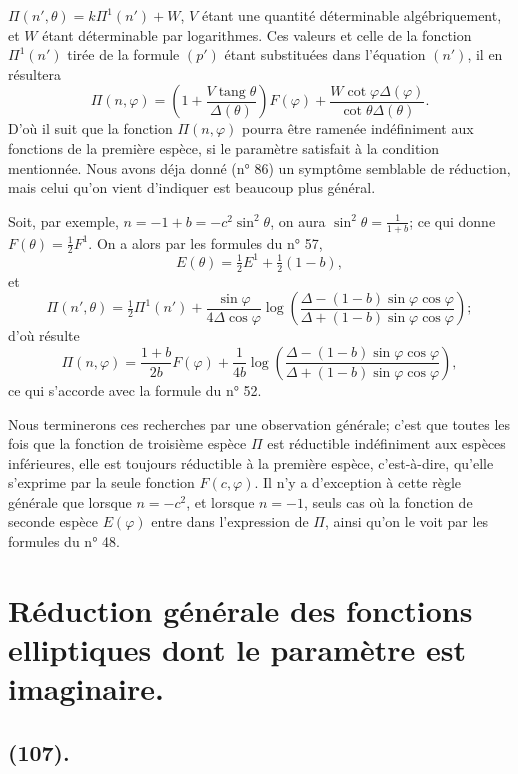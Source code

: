 \documentclass{article}
\begin{document}
$\Pi(n',\theta)=k\Pi^{1}(n')+W$, $V$ étant une quantité déterminable algébriquement, et $W$ étant déterminable par logarithmes. Ces valeurs et celle de la fonction $\Pi^{1}(n')$ tirée de la formule $(p')$ étant substituées dans l'équation $(n')$, il en résultera
\[ \Pi(n,\varphi)=\left(1+\frac{V\operatorname{tang}\theta}{\Delta(\theta)}\right)F(\varphi)+\frac{W\cot\varphi\Delta(\varphi)}{\cot\theta\Delta(\theta)}. \]
D'où il suit que la fonction $\Pi(n,\varphi)$ pourra être ramenée indéfiniment aux fonctions de la première espèce, si le paramètre satisfait à la condition mentionnée. Nous avons déja donné (n° 86) un symptôme semblable de réduction, mais celui qu'on vient d'indiquer est beaucoup plus général.

Soit, par exemple, $n=-1+b=-c^{2}\sin^{2}\theta$, on aura $\sin^{2}\theta=\frac{1}{1+b}$; ce qui donne $F(\theta)=\frac{1}{2}F^{1}$. On a alors par les formules du n° 57,
\[ E(\theta)=\tfrac{1}{2}E^{1}+\tfrac{1}{2}(1-b), \]
et
\[ \Pi(n',\theta)=\tfrac{1}{2}\Pi^{1}(n')+\frac{\sin\varphi}{4\Delta\cos\varphi}\log\left(\frac{\Delta-(1-b)\sin\varphi\cos\varphi}{\Delta+(1-b)\sin\varphi\cos\varphi}\right); \]
d'où résulte
\[ \Pi(n,\varphi)=\frac{1+b}{2b}F(\varphi)+\frac{1}{4b}\log\left(\frac{\Delta-(1-b)\sin\varphi\cos\varphi}{\Delta+(1-b)\sin\varphi\cos\varphi}\right), \]
ce qui s'accorde avec la formule du n° 52.

Nous terminerons ces recherches par une observation générale; c'est que toutes les fois que la fonction de troisième espèce $\Pi$ est réductible indéfiniment aux espèces inférieures, elle est toujours réductible à la première espèce, c'est-à-dire, qu'elle s'exprime par la seule fonction $F(c,\varphi)$. Il n'y a d'exception à cette règle générale que lorsque $n=-c^{2}$, et lorsque $n=-1$, seuls cas où la fonction de seconde espèce $E(\varphi)$ entre dans l'expression de $\Pi$, ainsi qu'on le voit par les formules du n° 48.

\section*{Réduction générale des fonctions elliptiques dont le paramètre est imaginaire.}

\subsection*{(107).}
\end{document}
